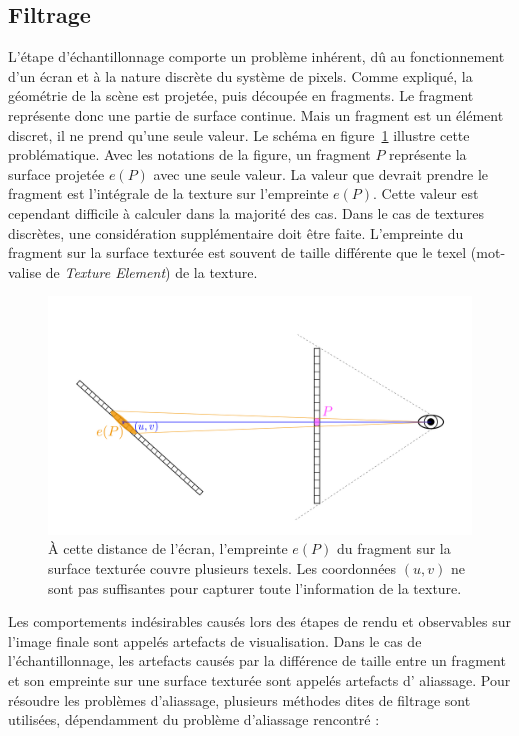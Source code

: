 \subsection{Filtrage}
\label{subsec:filtering}

L'étape d'échantillonnage comporte un problème inhérent, dû au fonctionnement d'un écran et à la nature discrète du système de pixels. Comme expliqué, la géométrie de la scène est projetée, puis découpée en fragments. Le fragment représente donc une partie de surface continue. Mais un fragment est un élément discret, il ne prend qu'une seule valeur. Le schéma en figure~\ref{fig:aliasing} illustre cette problématique. Avec les notations de la figure, un fragment $P$ représente la surface projetée $e(P)$ avec une seule valeur. La valeur que devrait prendre le fragment est l'intégrale de la texture sur l'empreinte $e(P)$. Cette valeur est cependant difficile à calculer dans la majorité des cas. Dans le cas de textures discrètes, une considération supplémentaire doit être faite. L'empreinte du fragment sur la surface texturée est souvent de taille différente que le texel (mot-valise de \textit{Texture Element}) de la texture.

\bigskip

\begin{figure}
    \centering
    \includegraphics[width=\textwidth]{contenu/resources/images/schema_filtrage}
    \caption[Visualisation du problème d'échantillonnage lors du rendu par tramage]{À cette distance de l'écran, l'empreinte $e(P)$ du fragment sur la surface texturée couvre plusieurs texels. Les coordonnées $(u, v)$ ne sont pas suffisantes pour capturer toute l'information de la texture.}
    \label{fig:aliasing}
\end{figure}

Les comportements indésirables causés lors des étapes de rendu et observables sur l'image finale sont appelés artefacts de visualisation. Dans le cas de l'échantillonnage, les artefacts causés par la différence de taille entre un fragment et son empreinte sur une surface texturée sont appelés artefacts d' aliassage. Pour résoudre les problèmes d'aliassage, plusieurs méthodes dites de filtrage sont utilisées, dépendamment du problème d'aliassage rencontré :

